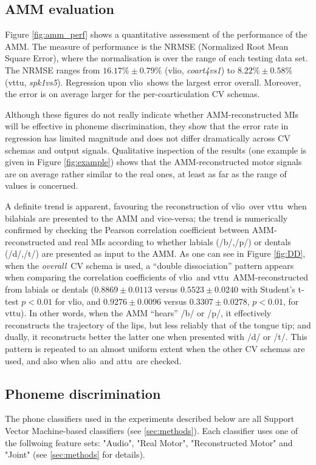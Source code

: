 \documentclass[10pt]{article}
\newcommand{\vlio}{\textsf{vlio}}
\newcommand{\vttu}{\textsf{vttu}}
\newcommand{\alio}{\textsf{alio}}
\newcommand{\attu}{\textsf{attu}}
\newcommand{\overall}{\emph{overall}}
\newcommand{\spkc}{\emph{spk1vs5}}
\newcommand{\coa}{\emph{coart4vs1}}
\begin{document}
\subsection*{AMM evaluation}
\label{subsec:amm_results}

Figure \ref{fig:amm_perf} shows a quantitative assessment of the performance
of the AMM. The measure of performance is the NRMSE (Normalized Root Mean Square Error),
where the normalisation is over the range of each testing data set. The NRMSE
ranges from $16.17\% \pm 0.79\%$ (\vlio, \coa) to $8.22\% \pm 0.58\%$ (\vttu, \spkc).
Regression upon \vlio\ shows the largest error overall. Moreover, the error is on average
larger for the per-coarticulation CV schemas.

Although these figures do not really indicate whether AMM-reconstructed MIs will be
effective in phoneme discrimination, they show that the error rate in regression has
limited magnitude and does not differ dramatically across CV schemas and output signals.
Qualitative inspection of the results (one example is given in Figure \ref{fig:example})
shows that the AMM-reconstructed motor signals are on average rather
similar to the real ones, at least as far as the range of values is concerned.

A definite trend is apparent, favouring the reconstruction of \vlio\ over \vttu\ when
bilabials are presented to the AMM and vice-versa; the trend is numerically confirmed
by checking the Pearson correlation coefficient between AMM-reconstructed and real MIs
according to whether labials (/b/,/p/) or dentals (/d/,/t/) are presented as input
to the AMM. As one can see in Figure \ref{fig:DD}, when the \overall\ CV schema is used,
a ``double dissociation'' pattern appears when comparing the correlation coefficients of
\vlio\ and \vttu\ AMM-reconstructed from labials or dentals
($0.8869 \pm 0.0113$ versus $0.5523 \pm 0.0240$ with Student's t-test $p<0.01$ for \vlio, and
 $0.9276 \pm 0.0096$ versus $0.3307 \pm 0.0278$, $p<0.01$, for \vttu).
In other words, when the AMM
``hears'' /b/ or /p/, it effectively reconstructs the trajectory of the lips, but less
reliably that of the tongue tip; and dually, it reconstructs better the latter one when
presented with /d/ or /t/. This pattern is repeated to an almost uniform extent when the
other CV schemas are used, and also when \alio\ and \attu\ are checked.

\subsection*{Phoneme discrimination}
\label{sec:class}
The phone classifiers used in the experiments described below are all Support Vector Machine-based classifiers 
\cite{BGV92} (see \ref{sec:methods}). Each classifier uses one of the follwoing feature sets: "Audio", "Real Motor", "Reconstructed Motor" and "Joint" (see \ref{sec:methods} for details).
\end{document}
